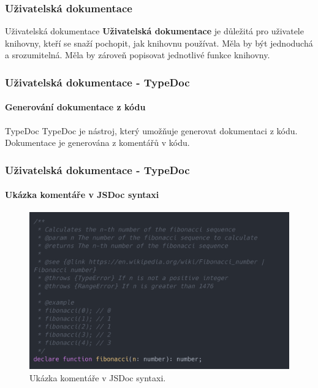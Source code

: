 \begin{frame}
    \frametitle{Uživatelská dokumentace}

    \begin{block}{Uživatelská dokumentace}
        \textbf{Uživatelská dokumentace} je důležitá pro uživatele knihovny, kteří se snaží pochopit, jak knihovnu používat.
        Měla by být jednoduchá a srozumitelná. Měla by zároveň popisovat jednotlivé funkce knihovny.
    \end{block}
\end{frame}

\begin{frame}
    \frametitle{Uživatelská dokumentace - TypeDoc}
    \framesubtitle{Generování dokumentace z kódu}

    \begin{block}{TypeDoc}
        TypeDoc je nástroj, který umožňuje generovat dokumentaci z kódu.
        Dokumentace je generována z komentářů v kódu.
    \end{block}
\end{frame}

\begin{frame}
    \frametitle{Uživatelská dokumentace - TypeDoc}
    \framesubtitle{Ukázka komentáře v JSDoc syntaxi}

    \begin{figure}
        \centering
        \includegraphics[height=0.65\textheight]{../resources/snippets/typeDoc/comment_example.ts.png}
        \caption{Ukázka komentáře v JSDoc syntaxi.}
    \end{figure}
\end{frame}

